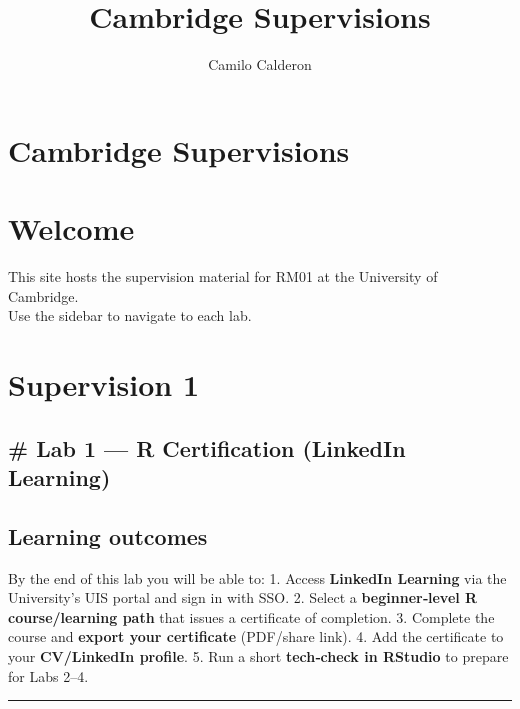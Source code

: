 \documentclass[
  letterpaper,
  DIV=11,
  numbers=noendperiod]{scrreprt}
\title{Cambridge Supervisions}
\author{Camilo Calderon}
\date{}
\renewcommand*\contentsname{Table of contents}
\newcommand\contentsname{Table of contents}
\begin{document}
\maketitle

\renewcommand*\contentsname{Table of contents}
{
\hypersetup{linkcolor=}
\setcounter{tocdepth}{2}
\tableofcontents
}


\chapter{Cambridge Supervisions}\label{cambridge-supervisions}


\chapter{Welcome}\label{welcome}

This site hosts the supervision material for RM01 at the University of
Cambridge.\\
Use the sidebar to navigate to each lab.


\chapter{Supervision 1}\label{supervision-1}

\section{\# Lab 1 --- R Certification (LinkedIn
Learning)}\label{lab-1-r-certification-linkedin-learning}

\section{Learning outcomes}\label{learning-outcomes}

By the end of this lab you will be able to: 1. Access \textbf{LinkedIn
Learning} via the University's UIS portal and sign in with SSO. 2.
Select a \textbf{beginner‑level R course/learning path} that issues a
certificate of completion. 3. Complete the course and \textbf{export
your certificate} (PDF/share link). 4. Add the certificate to your
\textbf{CV/LinkedIn profile}. 5. Run a short \textbf{tech‑check in
RStudio} to prepare for Labs 2--4.

\begin{center}\rule{0.5\linewidth}{0.5pt}\end{center}
\end{document}
